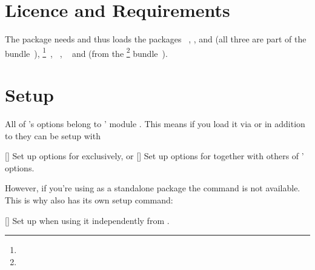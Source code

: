 \documentclass[load-preamble+]{cnltx-doc}
\begin{document}
\section{Licence and Requirements}
\license

The \chemformula{} package needs and thus loads the packages
~\cite{bnd:l3kernel}, ,  and
 (all three are part of the 
bundle~\cite{bnd:l3packages}),
\footnote{}~\cite{pkg:pgf},
~\cite{pkg:amsmath}, ~\cite{pkg:nicefrac} and
 (from the \KOMAScript\footnote{}
bundle~\cite{bnd:koma-script}).

\section{Setup}
All of \chemformula's options belong to \chemmacros' module
.  This means if you load it via \chemmacros{} or in
addition to \chemmacros{} they can be setup with
\begin{commands}
  []
    Set up options for \chemformula{} exclusively, or
  []
    Set up options for \chemformula{} together with others of \chemmacros'
    options.
\end{commands}
However, if you're using \chemformula{} as a standalone package the command
 is not available.  This is why \chemformula{} also has its own
setup command:
\begin{commands}
  []
    Set up \chemformula{} when using it independently from \chemmacros.
\end{commands}
\end{document}
